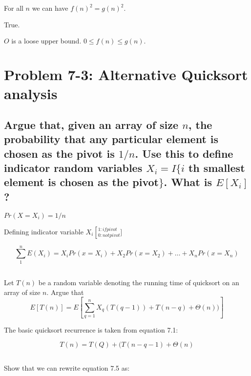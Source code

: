 \documentclass[titlepage]{article}\usepackage[]{graphicx}\usepackage[]{color}
\begin{document}
For all $n$ we can have $f(n)^2 = g(n)^2$.



True. 

$O$ is a loose upper bound. $0 \leq f(n) \leq g(n)$. 

\section{ Problem 7-3: Alternative Quicksort analysis}
\subsection{ 
Argue that, given an array of size $n$, the probability that any particular element
is chosen as the pivot is $1/n$. Use this to define indicator random variables
$X_i = I\{ i$ th smallest element is chosen as the pivot$\}$. What is
$E[X_i]$?}

$Pr(X=X_i) = 1/n$

Defining indicator variable $X_i \left[_{0: not pivot}^{1: if pivot}\right.]$

\[ \sum_{1}^{n} E(X_i) = X_i Pr(x=X_i) + X_2Pr(x = X_2) + \dots + X_n
Pr(x=X_n) \]



\subsection{}
Let $T(n)$ be a random variable denoting the running time of quicksort on an
array of size $n$. Argue that \\
\[ E[T(n)] = E \left[ \sum_{q=1}^{n} X_q (T(q-1)) + T(n-q) + \Theta(n))\right] \]

The basic quicksort recurrence is taken from equation 7.1:

\[ T(n) = T(Q) + (T(n-q-1) + \Theta(n) \]








\subsection{}
Show that we can rewrite equation 7.5 as:
\end{document}
